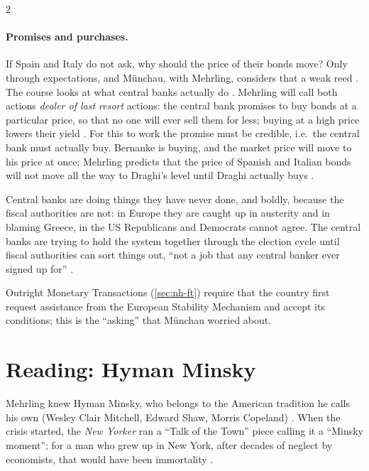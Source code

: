 \begin{paracol}{2}
\paragraph{Promises and purchases.} If Spain and Italy do not ask, why should the price of their bonds move? Only through
expectations, and Münchau, with Mehrling, considers that a weak reed . The course looks at what central banks actually
do . Mehrling will call both actions \emph{dealer of last resort} actions: the central bank promises to buy bonds at a
particular price, so that no one will ever sell them for less; buying at a high price lowers their yield .
For this to work the promise must be credible, i.e.\ the central bank must actually buy. Bernanke is buying, and the market price will
move to his price at once; Mehrling predicts that the price of Spanish and Italian bonds will not move all the way to Draghi's level
until Draghi actually buys .

\begin{intuition}
Central banks are doing things they have never done, and boldly, because the fiscal authorities are not: in Europe they are caught up in
austerity and in blaming Greece, in the US Republicans and Democrats cannot agree. The central banks are trying to hold the system
together through the election cycle until fiscal authorities can sort things out, ``not a job that any central banker ever signed up
for'' .
\end{intuition}\begin{coursenote}
Outright Monetary Transactions (\cref{sec:nh-ft}) require that the country first request assistance from the European Stability
Mechanism and accept its conditions; this is the ``asking'' that Münchau worried about.
\end{coursenote}

\section{Reading: Hyman Minsky}\label{sec:mv-minsky}

Mehrling knew Hyman Minsky, who belongs to the American tradition he calls his own (Wesley Clair Mitchell, Edward Shaw, Morris Copeland)
. When the crisis started, the \emph{New Yorker} ran a ``Talk of the Town'' piece calling it a ``Minsky moment''; for a man
who grew up in New York, after decades of neglect by economists, that would have been immortality .


\end{paracol}
